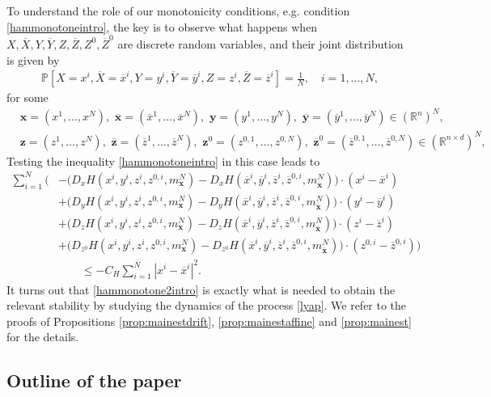 \documentclass[11pt,reqno]{amsart}
\numberwithin{equation}{section}
\theoremstyle{definition}
\def\R{{\mathbb R}}
\newcommand{\bx}{\mathbf{x}}
\newcommand{\by}{\mathbf{y}}
\newcommand{\bP}{\mathbb{P}}
\newcommand{\ov}{\overline}
\def \R{\mathbb{R}}
\newcommand{\bz}{\bm z}
\begin{document}
To understand the role of our monotonicity conditions, e.g. condition \eqref{hammonotoneintro}, the key is to observe what happens when $X,\ov{X}, Y, \ov{Y}, Z, \ov{Z}, Z^0, \ov{Z}^0$ are discrete random variables, and their joint distribution is given by
\begin{align*}
\bP[X = x^i, \ov{X} = \ov{x}^i, Y = y^i, \ov{Y} = \ov{y}^i, Z = z^i, \ov{Z} = \ov{z}^i ] = \frac{1}{N}, \quad i = 1,\dots,N,
\end{align*}
for some
\begin{align*}
        &\bx = (x^1,\dots,x^N), \,\, \ov{\bx} = (\ov{x}^1,\dots,\ov{x}^N), \,\, \by = (y^1,\dots,y^N), \,\, \ov{\by} = (\ov{y}^1,\dots,\ov{y}^N) \in (\R^n)^N, \\
        &\bz = (z^1,\dots,z^N), \,\, \ov{\bz} = (\ov{z}^1,\dots,\ov{z}^N), \,\, \bz^0 = (z^{0,1},\dots,z^{0,N}), \,\, \ov{\bz}^0 = (\ov{z}^{0,1},\dots,\ov{z}^{0,N}) \in (\R^{n \times d})^N, 
    \end{align*}
    Testing the inequality \eqref{hammonotoneintro} in this case leads to \begin{align} \label{hammonotone2intro}
        \sum_{i = 1}^N \bigg( &- \big(D_x H(x^i,y^i,z^i,z^{0,i},m_{\bx}^N) - D_x H(\ov{x}^i,\ov{y}^i,\ov{z}^i,\ov{z}^{0,i},m_{\ov{\bx}}^N) \big) \cdot (x^i - \ov{x}^i) 
        \nonumber \\
        &+  \big(D_y H(x^i,y^i,z^i,z^{0,i},m_{\bx}^N) - D_y H(\ov{x}^i,\ov{y}^i,\ov{z}^i,\ov{z}^{0,i}, m_{\ov{\bx}}^N) \big)\cdot (y^i - \ov{y}^i) 
        \nonumber \\
         &+  \big(D_z H(x^i,y^i,z^i,z^{0,i},m_{\bx}^N) - D_z H(\ov{x}^i,\ov{y}^i,\ov{z}^i,\ov{z}^{0,i},m_{\ov{\bx}}^N) \big) \cdot (z^i - \ov{z}^i)
        \nonumber  \\
         &+  \big(D_{z^0} H(x^i,y^i,z^i,z^{0,i},m_{\bx}^N) - D_{z^0} H(\ov{x}^i,\ov{y}^i,\ov{z}^i,\ov{z}^{0,i},m_{\ov{\bx}}^N) \big)  \cdot (z^{0,i} - \ov{z}^{0,i})  \bigg) \nonumber \\
         &\qquad \leq - C_H \sum_{i = 1}^N |x^i - \ov{x}^i|^2.
    \end{align}
It turns out that \eqref{hammonotone2intro} is exactly what is needed to obtain the relevant stability by studying the dynamics of the process \eqref{lyap}. We refer to the proofs of Propositions \ref{prop:mainestdrift}, \ref{prop:mainestaffine} and \ref{prop:mainest} for the details.

\subsection{Outline of the paper} 
\end{document}

